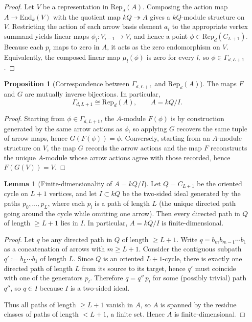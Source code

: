\documentclass{article}
\theoremstyle{definition}
\newtheorem{proposition}[theorem]{Proposition}
\newtheorem{lemma}[theorem]{Lemma}
\begin{document}
\begin{proof}
Let $V$ be a representation in $\mathrm{Rep}_d(A)$.
Composing the action map $A\to \mathrm{End}_k(V)$ with the quotient map $kQ\twoheadrightarrow A$ gives a $kQ$-module structure on $V$.
Restricting the action of each arrow basis element $a_i$ to the appropriate vertex summand yields linear maps $\phi_i:V_{i-1}\to V_{i}$ and hence a point $\phi\in\mathrm{Rep}_d(C_{L+1})$.
Because each $p_l$ maps to zero in $A$, it acts as the zero endomorphism on $V$.
Equivalently, the composed linear map $\mu_l(\phi)$ is zero for every $l$, so $\phi\in\Gamma_{d,L+1}$.
\end{proof}

\begin{proposition}[Correspondence between $\Gamma_{d,L+1}$ and $\mathrm{Rep}_d(A)$]
The maps $F$ and $G$ are mutually inverse bijections. In particular,
\[
\Gamma_{d,L+1} \cong \mathrm{Rep}_d(A),\qquad A=kQ/I.
\]
\end{proposition}

\begin{proof}
Starting from $\phi\in\Gamma_{d,L+1}$, the $A$-module $F(\phi)$ is by construction generated by the same arrow actions as $\phi$, so applying $G$ recovers the same tuple of arrow maps, hence $G(F(\phi))=\phi$.
Conversely, starting from an $A$-module structure on $V$, the map $G$ records the arrow actions and the map $F$ reconstructs the unique $A$-module whose arrow actions agree with those recorded, hence $F(G(V))=V$.
\end{proof}
\begin{lemma}[Finite-dimensionality of $A=kQ/I$]\label{lem:A-finite-dim}
Let $Q=C_{L+1}$ be the oriented cycle on $L+1$ vertices, and let $I\subset kQ$ be the two-sided ideal generated by the paths
$p_0,\dots,p_{L}$, where each $p_l$ is a path of length $L$ (the unique directed path going around the cycle while omitting one arrow).
Then every directed path in $Q$ of length $\ge L +1$ lies in $I$. In particular, $A=kQ/I$ is finite-dimensional.
\end{lemma}

\begin{proof}
Let $q$ be any directed path in $Q$ of length $\ge L+1$. Write $q=b_m b_{m-1}\cdots b_1$ as a concatenation of arrows with $m\ge L+1$.
Consider the contiguous subpath $q':=b_{L}\cdots b_1$ of length $L$. Since $Q$ is an oriented $L+1$-cycle, there is exactly one directed
path of length $L$ from its source to its target, hence $q'$ must coincide with one of the generators $p_l$.
Therefore $q=q''\,p_l$ for some (possibly trivial) path $q''$, so $q\in I$ because $I$ is a two-sided ideal.

Thus all paths of length $\ge L+1$ vanish in $A$, so $A$ is spanned by the residue classes of paths of length $<L+1$, a finite set. Hence $A$ is finite-dimensional.
\end{proof}
\end{document}
